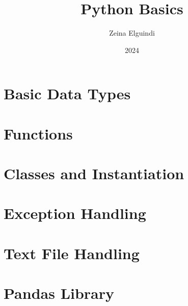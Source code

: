 \documentclass[titlepage]{article}
\title{Python Basics}
\author{Zeina Elguindi}
\date{2024}
\begin{document}
\maketitle


\tableofcontents
\newpage

\section{Basic Data Types}


\newpage

\section{Functions}


\newpage
\section{Classes and Instantiation}


\newpage
\section{Exception Handling}



\newpage
\section{Text File Handling}


\newpage
\section{Pandas Library}

\end{document}
